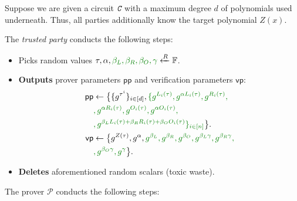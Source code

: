 \documentclass[../lecture-notes.tex]{subfiles}
\begin{document}
\begin{tcolorbox}[breakable, title=Attempt \#3: Sound SNARK Protocol,
    colback=blue!5!white,
    colframe=blue!75!black,
    colbacktitle=blue!25!white,
    coltitle=blue!20!black,
    fonttitle=\bfseries,
    boxrule=1.25pt,
    subtitle style={boxrule=0pt,
    colback=blue!20!white,
    colupper=blue!75!gray} ]

    Suppose we are given a circuit $\textit{\texttt{C}}$ with a maximum degree $d$ of polynomials used underneath. Thus, all parties additionally know the target polynomial $Z(x)$.

    The \emph{trusted party} conducts the following steps:
    \begin{itemize}[label=, left=0.7em]
        \item Picks random values $\tau, \alpha, \textcolor{green!50!black}{\beta_L, \beta_R, \beta_O, \gamma} \xleftarrow{R} \mathbb{F}$.
        \item \textbf{Outputs} prover parameters $\mathsf{pp}$ and verification parameters $\mathsf{vp}$:
        \begin{equation*}
            \begin{aligned}
                \mathsf{pp} & \gets \big\{\{g^{\tau^i}\}_{i \in [d]}, \textcolor{green!50!black}{\{g^{L_i(\tau)}, g^{\alpha L_i(\tau)}, g^{R_i(\tau)},} \\ 
                            & \textcolor{green!50!black}{, g^{\alpha R_i(\tau)}, g^{O_i(\tau)}, g^{\alpha O_i(\tau)},} \\
                            & \textcolor{green!50!black}{, g^{\beta_LL_i(\tau)+\beta_RR_i(\tau)+\beta_OO_i(\tau)}\}_{i \in [n]}}  \big\}. \\
                \mathsf{vp} & \gets \big\{ g^{Z(\tau)}, g^{\alpha}, \textcolor{green!50!black}{g^{\beta_L}, g^{\beta_R}, g^{\beta_O}, g^{\beta_L\gamma}, g^{\beta_R\gamma},} \\
                            & \textcolor{green!50!black}{, g^{\beta_O\gamma}, g^{\gamma}}  \big\}.
            \end{aligned}
        \end{equation*}
        \item \textbf{Deletes} aforementioned random scalars (toxic waste).
    \end{itemize}
    The prover $\mathcal{P}$ conducts the following steps:
    \begin{itemize}[label=]

\end{itemize}
\end{tcolorbox}
\end{document}

